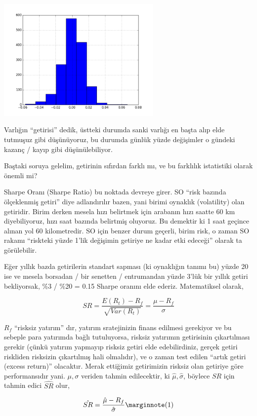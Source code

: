 \documentclass[12pt,fleqn]{article}\usepackage{../../common}
\begin{document}
\includegraphics[height=6cm]{tser_back_01.png}

Varlığın ``getirisi'' dedik, üstteki durumda sanki varlığı en başta alıp
elde tutmuşuz gibi düşünüyoruz, bu durumda günlük yüzde değişimler o gündeki
kazanç / kayıp gibi düşünülebiliyor. 

Baştaki soruya gelelim, getirinin sıfırdan farklı mı, ve bu farklılık
istatistiki olarak önemli mi?

Sharpe Oranı (Sharpe Ratio) bu noktada devreye girer. SO ``risk bazında
ölçeklenmiş getiri'' diye adlandırılır bazen, yani birimi oynaklık (volatility)
olan getiridir. Birim derken mesela hızı belirtmek için arabanın hızı saatte 60
km diyebiliyoruz, hızı saat bazında belirtmiş oluyoruz. Bu demektir ki 1 saat
geçince alınan yol 60 kilometredir. SO için benzer durum geçerli, birim risk, o
zaman SO rakamı ``riskteki yüzde 1'lik değişimin getiriye ne kadar etki
edeceği'' olarak ta görülebilir.

Eğer yıllık bazda getirilerin standart sapması (ki oynaklığın tanımı bu) yüzde
20 ise ve mesela borsadan / bir senetten / entrumandan yüzde 3'lük bir yıllık
getiri bekliyorsak, \%3 / \%20 = 0.15 Sharpe oranını elde ederiz. Matematiksel
olarak,

$$ SR = \frac{E(R_t) - R_f}{\sqrt{Var(R_t)}} = \frac{\mu - R_f}{\sigma} $$

$R_f$ ``risksiz yatırım'' dır, yatırım sratejinizin finans edilmesi
gerekiyor ve bu sebeple para yatırımda bağlı tutuluyorsa, risksiz yatırımın
getirisinin çıkartılması gerekir (çünkü yatırım yapmayıp risksiz getiri
elde edebilirdiniz, gerçek getiri riskliden risksizin çıkartılmış hali
olmalıdır), ve o zaman test edilen ``artık getiri (excess return)''
olacaktır. Merak ettiğimiz getirimizin risksiz olan getiriye göre
performansıdır yani. $\mu,\sigma$ veriden tahmin edilecektir, ki
$\hat{\mu},\hat{\sigma}$, böylece $SR$ için tahmin edici $\hat{SR}$ olur,

$$ 
\hat{SR} = \frac{\hat{\mu} - R_f}{\hat{\sigma}} 
\mlabel{1} 
$$
\end{document}
